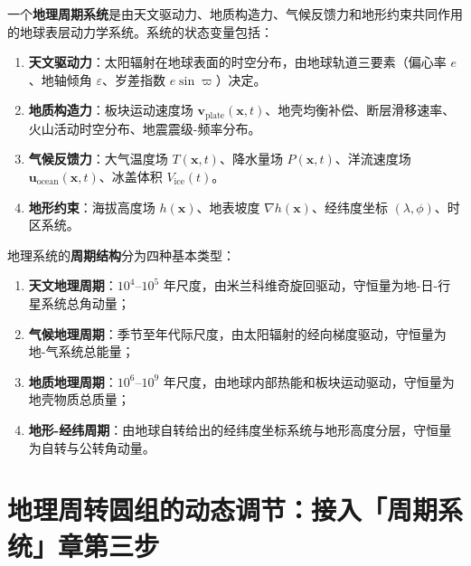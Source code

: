 \begin{definition}[地理周期系统与周期结构]\label{def:geographic_periodic_system}
一个\textbf{地理周期系统}是由天文驱动力、地质构造力、气候反馈力和地形约束共同作用的地球表层动力学系统。系统的状态变量包括：
\begin{enumerate}[label=(\roman*)]
    \item \textbf{天文驱动力}：太阳辐射在地球表面的时空分布，由地球轨道三要素（偏心率 $e$、地轴倾角 $\varepsilon$、岁差指数 $e\sin\varpi$）决定。
    \item \textbf{地质构造力}：板块运动速度场 $\mathbf{v}_{\text{plate}}(\mathbf{x}, t)$、地壳均衡补偿、断层滑移速率、火山活动时空分布、地震震级-频率分布。
    \item \textbf{气候反馈力}：大气温度场 $T(\mathbf{x}, t)$、降水量场 $P(\mathbf{x}, t)$、洋流速度场 $\mathbf{u}_{\text{ocean}}(\mathbf{x}, t)$、冰盖体积 $V_{\text{ice}}(t)$。
    \item \textbf{地形约束}：海拔高度场 $h(\mathbf{x})$、地表坡度 $\nabla h(\mathbf{x})$、经纬度坐标 $(\lambda, \phi)$、时区系统。
\end{enumerate}
\end{definition}

\begin{definition}[地理系统的周期结构]\label{def:geographic_periodic_structure}
地理系统的\textbf{周期结构}分为四种基本类型：
\begin{enumerate}[label=(\roman*)]
    \item \textbf{天文地理周期}：$10^4$--$10^5$ 年尺度，由米兰科维奇旋回驱动，守恒量为地-日-行星系统总角动量；
    \item \textbf{气候地理周期}：季节至年代际尺度，由太阳辐射的经向梯度驱动，守恒量为地-气系统总能量；
    \item \textbf{地质地理周期}：$10^6$--$10^9$ 年尺度，由地球内部热能和板块运动驱动，守恒量为地壳物质总质量；
    \item \textbf{地形-经纬周期}：由地球自转给出的经纬度坐标系统与地形高度分层，守恒量为自转与公转角动量。
\end{enumerate}
\end{definition}

\section{地理周转圆组的动态调节：接入「周期系统」章第三步}
\label{sec:geo_adaptive}


